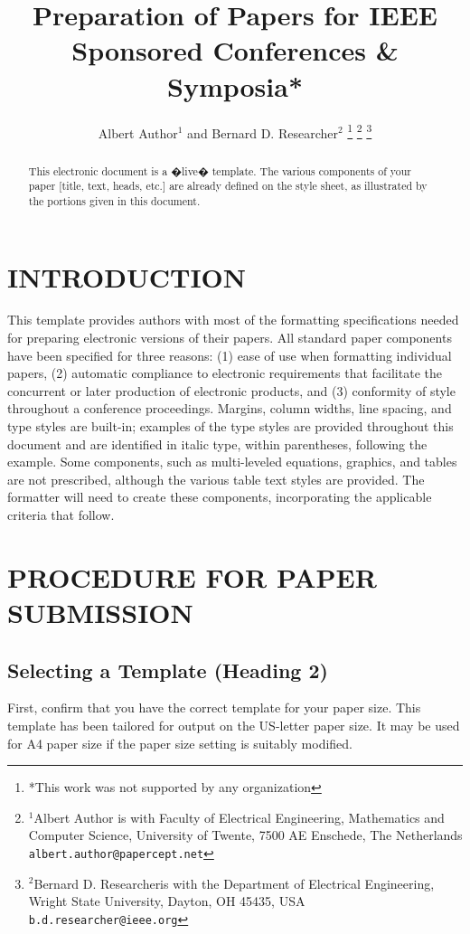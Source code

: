 \documentclass[letterpaper, 10 pt, conference]{ieeeconf}  %
\title{\LARGE \bf
Preparation of Papers for IEEE Sponsored Conferences \& Symposia*
}
\author{Albert Author$^{1}$ and Bernard D. Researcher$^{2}$%
\thanks{*This work was not supported by any organization}%
\thanks{$^{1}$Albert Author is with Faculty of Electrical Engineering, Mathematics and Computer Science,
        University of Twente, 7500 AE Enschede, The Netherlands
        {\tt\small albert.author@papercept.net}}%
\thanks{$^{2}$Bernard D. Researcheris with the Department of Electrical Engineering, Wright State University,
        Dayton, OH 45435, USA
        {\tt\small b.d.researcher@ieee.org}}%
}
\begin{document}
\maketitle
\thispagestyle{empty}
\pagestyle{empty}


\begin{abstract}

This electronic document is a �live� template. The various components of your paper [title, text, heads, etc.] are already defined on the style sheet, as illustrated by the portions given in this document.

\end{abstract}


\section{INTRODUCTION}

This template provides authors with most of the formatting specifications needed for preparing electronic versions of their papers. All standard paper components have been specified for three reasons: (1) ease of use when formatting individual papers, (2) automatic compliance to electronic requirements that facilitate the concurrent or later production of electronic products, and (3) conformity of style throughout a conference proceedings. Margins, column widths, line spacing, and type styles are built-in; examples of the type styles are provided throughout this document and are identified in italic type, within parentheses, following the example. Some components, such as multi-leveled equations, graphics, and tables are not prescribed, although the various table text styles are provided. The formatter will need to create these components, incorporating the applicable criteria that follow.

\section{PROCEDURE FOR PAPER SUBMISSION}

\subsection{Selecting a Template (Heading 2)}

First, confirm that you have the correct template for your paper size. This template has been tailored for output on the US-letter paper size. 
It may be used for A4 paper size if the paper size setting is suitably modified.
\end{document}

